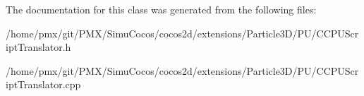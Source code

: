 The documentation for this class was generated from the following files\+:\begin{DoxyCompactItemize}
\item 
/home/pmx/git/\+P\+M\+X/\+Simu\+Cocos/cocos2d/extensions/\+Particle3\+D/\+P\+U/C\+C\+P\+U\+Script\+Translator.\+h\item 
/home/pmx/git/\+P\+M\+X/\+Simu\+Cocos/cocos2d/extensions/\+Particle3\+D/\+P\+U/C\+C\+P\+U\+Script\+Translator.\+cpp\end{DoxyCompactItemize}
